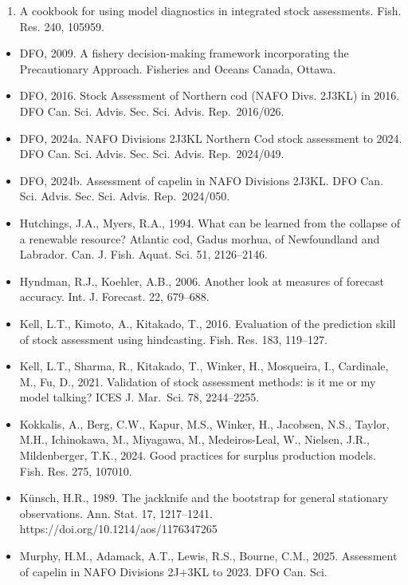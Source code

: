 \documentclass[11pt]{article}
\providecommand{\tightlist}{\setlength{\itemsep}{0.2em}\setlength{\parskip}{0pt}}
\begin{document}
\begin{enumerate}
\def\labelenumi{\arabic{enumi}.}
\setcounter{enumi}{2020}
\tightlist
\item
  A cookbook for using model diagnostics in integrated stock
  assessments. Fish. Res. 240, 105959.
\end{enumerate}

\begin{itemize}
\item
  DFO, 2009. A fishery decision-making framework incorporating the
  Precautionary Approach. Fisheries and Oceans Canada, Ottawa.
\item
  DFO, 2016. Stock Assessment of Northern cod (NAFO Divs. 2J3KL) in
  2016. DFO Can. Sci. Advis. Sec. Sci. Advis. Rep.~2016/026.
\item
  DFO, 2024a. NAFO Divisions 2J3KL Northern Cod stock assessment to
  2024. DFO Can. Sci. Advis. Sec. Sci. Advis. Rep.~2024/049.
\item
  DFO, 2024b. Assessment of capelin in NAFO Divisions 2J3KL. DFO Can.
  Sci. Advis. Sec. Sci. Advis. Rep.~2024/050.
\item
  Hutchings, J.A., Myers, R.A., 1994. What can be learned from the
  collapse of a renewable resource? Atlantic cod, Gadus morhua, of
  Newfoundland and Labrador. Can. J. Fish. Aquat. Sci. 51, 2126--2146.
\item
  Hyndman, R.J., Koehler, A.B., 2006. Another look at measures of
  forecast accuracy. Int. J. Forecast. 22, 679--688.
\item
  Kell, L.T., Kimoto, A., Kitakado, T., 2016. Evaluation of the
  prediction skill of stock assessment using hindcasting. Fish. Res.
  183, 119--127.
\item
  Kell, L.T., Sharma, R., Kitakado, T., Winker, H., Mosqueira, I.,
  Cardinale, M., Fu, D., 2021. Validation of stock assessment methods:
  is it me or my model talking? ICES J. Mar.~Sci. 78, 2244--2255.
\item
  Kokkalis, A., Berg, C.W., Kapur, M.S., Winker, H., Jacobsen, N.S.,
  Taylor, M.H., Ichinokawa, M., Miyagawa, M., Medeiros-Leal, W.,
  Nielsen, J.R., Mildenberger, T.K., 2024. Good practices for surplus
  production models. Fish. Res. 275, 107010.
\item
  Künsch, H.R., 1989. The jackknife and the bootstrap for general
  stationary observations. Ann. Stat. 17, 1217--1241.
  https://doi.org/10.1214/aos/1176347265
\item
  Murphy, H.M., Adamack, A.T., Lewis, R.S., Bourne, C.M., 2025.
  Assessment of capelin in NAFO Divisions 2J+3KL to 2023. DFO Can. Sci.

\end{itemize}
\end{document}
